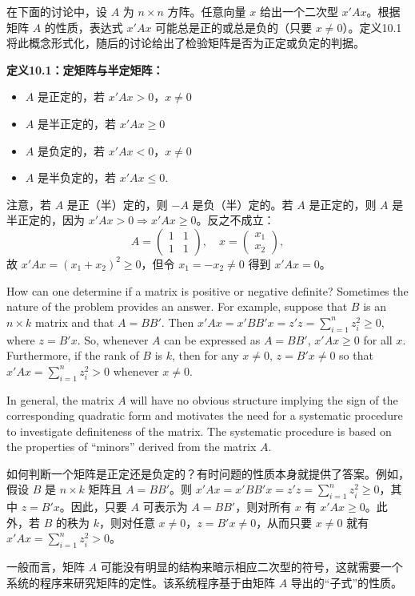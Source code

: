 \begin{translation}
在下面的讨论中，设 $A$ 为 $n \times n$ 方阵。任意向量 $x$ 给出一个二次型 $x'Ax$。根据矩阵 $A$ 的性质，表达式 $x'Ax$ 可能总是正的或总是负的（只要 $x \neq 0$）。定义10.1将此概念形式化，随后的讨论给出了检验矩阵是否为正定或负定的判据。

\textbf{定义10.1：定矩阵与半定矩阵：}
\begin{itemize}
\item $A$ 是正定的，若 $x'Ax > 0$，$x \neq 0$
\item $A$ 是半正定的，若 $x'Ax \geq 0$
\item $A$ 是负定的，若 $x'Ax < 0$，$x \neq 0$
\item $A$ 是半负定的，若 $x'Ax \leq 0$.
\end{itemize}

注意，若 $A$ 是正（半）定的，则 $-A$ 是负（半）定的。若 $A$ 是正定的，则 $A$ 是半正定的，因为 $x'Ax > 0 \Rightarrow x'Ax \geq 0$。反之不成立：
\[
A = \begin{pmatrix} 1 & 1 \\ 1 & 1 \end{pmatrix}, \quad x = \begin{pmatrix} x_1 \\ x_2 \end{pmatrix},
\]
故 $x'Ax = (x_1 + x_2)^2 \geq 0$，但令 $x_1 = -x_2 \neq 0$ 得到 $x'Ax = 0$。
\end{translation}

\begin{original}
How can one determine if a matrix is positive or negative definite? Sometimes the nature of the problem provides an answer. For example, suppose that $B$ is an $n \times k$ matrix and that $A = BB'$. Then $x'Ax = x'BB'x = z'z = \sum_{i=1}^n z_i^2 \geq 0$, where $z = B'x$. So, whenever $A$ can be expressed as $A = BB'$, $x'Ax \geq 0$ for all $x$. Furthermore, if the rank of $B$ is $k$, then for any $x \neq 0$, $z = B'x \neq 0$ so that $x'Ax = \sum_{i=1}^n z_i^2 > 0$ whenever $x \neq 0$.

In general, the matrix $A$ will have no obvious structure implying the sign of the corresponding quadratic form and motivates the need for a systematic procedure to investigate definiteness of the matrix. The systematic procedure is based on the properties of ``minors'' derived from the matrix $A$.
\end{original}
\begin{translation}
如何判断一个矩阵是正定还是负定的？有时问题的性质本身就提供了答案。例如，假设 $B$ 是 $n \times k$ 矩阵且 $A = BB'$。则 $x'Ax = x'BB'x = z'z = \sum_{i=1}^n z_i^2 \geq 0$，其中 $z = B'x$。因此，只要 $A$ 可表示为 $A = BB'$，则对所有 $x$ 有 $x'Ax \geq 0$。此外，若 $B$ 的秩为 $k$，则对任意 $x \neq 0$，$z = B'x \neq 0$，从而只要 $x \neq 0$ 就有 $x'Ax = \sum_{i=1}^n z_i^2 > 0$。

一般而言，矩阵 $A$ 可能没有明显的结构来暗示相应二次型的符号，这就需要一个系统的程序来研究矩阵的定性。该系统程序基于由矩阵 $A$ 导出的``子式''的性质。
\end{translation}

